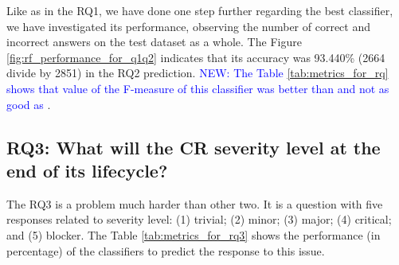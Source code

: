 \documentclass[10pt, conference]{IEEEtran}
\newcommand{\new}[1]{\noindent\textcolor{blue}{NEW: {#1}}}
\newcommand{\new}[1]{#1}
\begin{document}
Like as in the RQ1, we have done one step further regarding the best classifier, we have investigated its performance, observing the number of correct and incorrect answers on the test dataset as a whole. The Figure \ref{fig:rf_performance_for_q1q2} indicates that its accuracy was 93.440\% (2664 divide by 2851) in the RQ2 prediction. \new{The Table \ref{tab:metrics_for_rq}
shows that value of the F-measure of this classifier was better than \cite{Tian2012} and not as good as \cite{Menzies2008}}.


\subsection{RQ3: What will the CR severity level at the end of its lifecycle?}

The RQ3 is a problem much harder than other two. It is a question with five responses related to severity level: (1) trivial; (2) minor; (3) major; (4) critical; and (5) blocker. The Table \ref{tab:metrics_for_rq3} shows the performance (in percentage) of the classifiers to predict the response to this issue.
\end{document}
